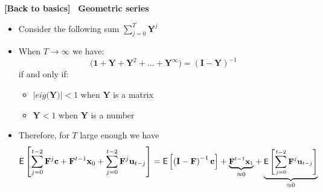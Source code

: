 \documentclass[10pt,handout]{beamer}
\begin{document}
\begin{frame}
{{\footnotesize \textbf{[Back to basics]}} \textbf{\ {Geometric series } }}

\begin{itemize}
\item Consider the following sum $\sum\limits_{j=0}^{T}\mathbf{Y}^{j}$%
\medskip \pause

\item When $T\rightarrow \infty $ we have: 
\begin{equation*}
\mathbf{(1+Y}+\mathbf{Y}^{2}+\mathbf{...}+\mathbf{Y}^{\infty }\mathbf{)=}%
\left( \mathbf{I}-\mathbf{Y}\right) ^{-1}
\end{equation*}%
if and only if:\pause

\begin{itemize}
\item $\left\vert eig(\mathbf{Y)}\right\vert <1$ when $\mathbf{Y}$ is a
matrix\pause

\item $\mathbf{Y}<1$ when $\mathbf{Y}$ is a number\medskip \pause
\end{itemize}

\item Therefore, for $T$ large enough we have 
\begin{equation*}
\small\mathsf{E}\left[ \sum\limits_{j=0}^{t-2}\mathbf{F}^{j}\mathbf{c}+%
\mathbf{F}^{t-1}\mathbf{x}_{0}+\sum\limits_{j=0}^{t-2}\mathbf{F}^{j}\mathbf{u%
}_{t-j}\right] =\mathsf{E}\left[ \left( \mathbf{I}-\mathbf{F}\right) ^{-1}%
\mathbf{c}\right] +\underset{\approx 0}{\underbrace{\mathbf{F}^{t-1}\mathbf{x%
}_{1}}}+\underset{\approx 0}{\underbrace{\mathsf{E}\left[ \sum%
\limits_{j=0}^{t-2}\mathbf{F}^{j}\mathbf{u}_{t-j}\right] }}
\end{equation*}
\end{itemize}
\end{frame}

\everymath\expandafter{\the\everymath \color{title!80}}
\everydisplay\expandafter{\the\everydisplay \color{title!80}}%
\end{document}

